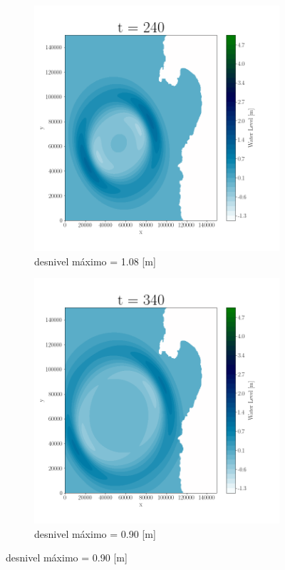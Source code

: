 \begin{figure}[H]
\begin{subfigure}[b]{.4\linewidth}
\includegraphics[width=\linewidth]{Figures/Plots/Antofa3.png}
\caption{desnivel máximo = 1.08 [m]}
\end{subfigure}
\begin{subfigure}[b]{.4\linewidth}
\includegraphics[width=\linewidth]{Figures/Plots/Antofa4.png}
\caption{desnivel máximo = 0.90 [m]}
\end{subfigure}


\end{figure}
